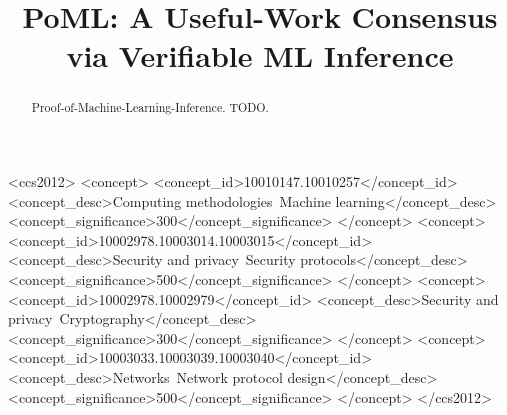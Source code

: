 \documentclass[sigconf]{acmart} %
\begin{document}
\title{PoML: A Useful-Work Consensus via Verifiable ML Inference}






\renewcommand{\shortauthors}{anonymous.}


\begin{abstract}
Proof-of-Machine-Learning-Inference. TODO.

\end{abstract}

\begin{CCSXML}
<ccs2012>
   <concept>
       <concept_id>10010147.10010257</concept_id>
       <concept_desc>Computing methodologies~Machine learning</concept_desc>
       <concept_significance>300</concept_significance>
       </concept>
   <concept>
       <concept_id>10002978.10003014.10003015</concept_id>
       <concept_desc>Security and privacy~Security protocols</concept_desc>
       <concept_significance>500</concept_significance>
       </concept>
   <concept>
       <concept_id>10002978.10002979</concept_id>
       <concept_desc>Security and privacy~Cryptography</concept_desc>
       <concept_significance>300</concept_significance>
       </concept>
   <concept>
       <concept_id>10003033.10003039.10003040</concept_id>
       <concept_desc>Networks~Network protocol design</concept_desc>
       <concept_significance>500</concept_significance>
       </concept>
 </ccs2012>
\end{CCSXML}
\end{document}
